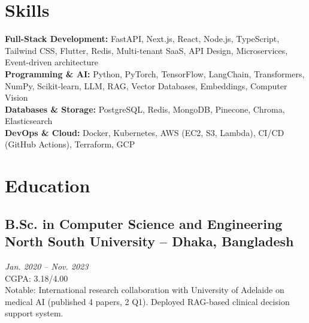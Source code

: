 \documentclass[letterpaper,10pt]{article}
\begin{document}
\section*{Skills}

\RaggedRight
\textbf{Full-Stack Development:} FastAPI, Next.js, React, Node.js, TypeScript, Tailwind CSS, Flutter, Redis, Multi-tenant SaaS, API Design, Microservices, Event-driven architecture \\
\textbf{Programming \& AI:} Python, PyTorch, TensorFlow, LangChain, Transformers, NumPy, Scikit-learn, LLM, RAG, Vector Databases, Embeddings, Computer Vision \\
\textbf{Databases \& Storage:} PostgreSQL, Redis, MongoDB, Pinecone, Chroma, Elasticsearch \\
\textbf{DevOps \& Cloud:} Docker, Kubernetes, AWS (EC2, S3, Lambda), CI/CD (GitHub Actions), Terraform, GCP

\section*{Education}

\subsection*{\textbf{B.Sc. in Computer Science and Engineering} \hfill \textbf{North South University} -- Dhaka, Bangladesh}
\textit{Jan. 2020 – Nov. 2023} \\
CGPA: 3.18/4.00 \\
Notable: International research collaboration with University of Adelaide on medical AI (published 4 papers, 2 Q1). Deployed RAG-based clinical decision support system.
\end{document}
